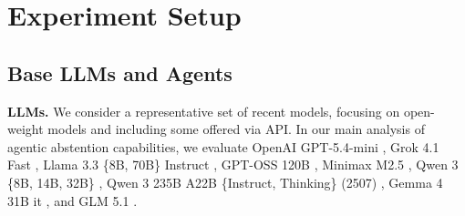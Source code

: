 \documentclass{article}
\begin{document}










\vspace{-2mm}
\section{Experiment Setup}
\vspace{-2mm}

\label{sec:experiments}
\subsection{Base LLMs and Agents}
\vspace{-2mm}

\textbf{LLMs.} We consider a representative set of recent models, focusing on open-weight models and including some offered via API. In our main analysis of agentic abstention capabilities, we evaluate OpenAI GPT-5.4-mini \cite{openai_gpt5mini_2025}, Grok 4.1 Fast \cite{xai2025grok41}, Llama 3.3 \{8B, 70B\} Instruct \cite{llama33_70b}, GPT-OSS 120B \cite{agarwal2025gpt}, Minimax M2.5 \cite{minimax2026m25}, Qwen 3 \{8B, 14B, 32B\} \cite{qwen3technicalreport}, Qwen 3 235B A22B \{Instruct, Thinking\} (2507) \cite{qwen3technicalreport}, Gemma 4 31B it \cite{googledeepmind2026gemma4_31bit}, and GLM 5.1 \cite{glm5team2026glm5vibecodingagentic}.
\end{document}
